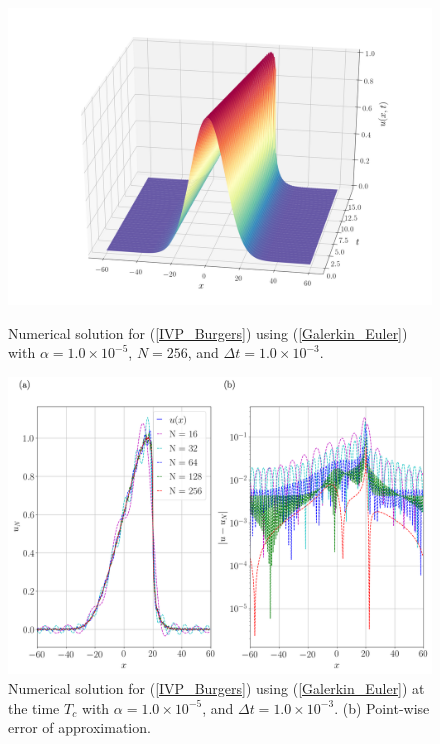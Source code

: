 	\newpage
	\begin{figure}[H]
		\centering
		\includegraphics[width=12cm]{burgers_equation/deterministic/numerical_experiments/inviscid/figures/small_alpha.png}
		\caption{Numerical solution for (\ref{IVP_Burgers}) using (\ref{Galerkin_Euler}) with $\alpha = 1.0 \times 10^{-5}$, $N=256$, and $\Delta t = 1.0 \times 10^{-3}$.}
		\vspace{2mm}
		\includegraphics[width=12.5cm]{burgers_equation/deterministic/numerical_experiments/inviscid/figures/small_alpha_T.png}
		\caption{Numerical solution for (\ref{IVP_Burgers}) using (\ref{Galerkin_Euler}) at the time $T_c$ with $\alpha = 1.0 \times 10^{-5}$, and $\Delta t = 1.0 \times 10^{-3}$. (b) Point-wise error of approximation.}
	\end{figure}
	\newpage
